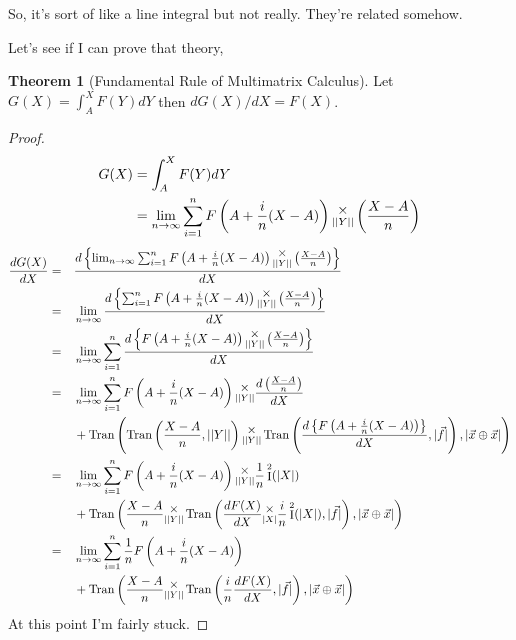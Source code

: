 \documentclass[12pt]{article}
\theoremstyle{definition}
\newtheorem{theorem}{Theorem}[section]
\theoremstyle{case}
\theoremstyle{ppart}
\DeclareMathOperator{\Ident}{I}
\DeclareMathOperator{\Tran}{Tran}
\newcommand{\mmult}[1]{\text{\raisebox{1ex}{$\underset{#1}{\times}$}}}
\begin{document}
So, it's sort of like a line integral but not really. They're related somehow.

\begin{landscape}
Let's see if I can prove that theory,
\begin{theorem}[Fundamental Rule of Multimatrix Calculus]
Let $G(X) = \int_A^X F(Y) dY$ then $dG(X)/dX = F(X)$.
\end{theorem}
\begin{proof}
\begin{align*}
	G(X)
	&= \int_A^X F(Y) dY \\
	&= 
		\lim_{n \to \infty}
	 	\sum_{i=1}^n
		  F\left(A+\frac{i}{n}(X-A)\right)
		  \mmult{||Y||}
		  \left(\frac{X-A}{n}\right)
\end{align*}
\begin{alignat*}{3}
	\frac{dG(X)}{dX}
	&=&&
	  \frac{
			d \left\{
			\lim_{n \to \infty}
			\sum_{i=1}^n
				F\left(A+\frac{i}{n}(X-A)\right)
				\mmult{||Y||}
				\left(\frac{X-A}{n}\right)
			\right\}
		}{dX} \\
	&=&&
		\lim_{n \to \infty}
		\frac{
			d \left\{
			\sum_{i=1}^n
				F\left(A+\frac{i}{n}(X-A)\right)
				\mmult{||Y||}
				\left(\frac{X-A}{n}\right)
			\right\}
		}{dX} \\
	&=&&
		\lim_{n \to \infty}
		\sum_{i=1}^n
			\frac{
				d \left\{
					F\left(A+\frac{i}{n}(X-A)\right)
					\mmult{||Y||}
					\left(\frac{X-A}{n}\right)
				\right\}
			}{dX} \\
	&=&&
		\lim_{n \to \infty}
			\sum_{i=1}^n
				F\left(A+\frac{i}{n}(X-A)\right)
					\mmult{||Y||}
					\frac{d \left(\frac{X-A}{n}\right)}{dX}
				\\&&&+
				\Tran\left(
					\Tran\left(\frac{X-A}{n}, ||Y||\right)
					\mmult{||Y||}
					\Tran\left(\frac{
						d \left\{F\left(A+\frac{i}{n}(X-A)\right)\right\}
					}{dX}, |\vec{f}|\right),
					|\vec{x} \oplus \vec{x}|
				\right) \\
	&=&&
		\lim_{n \to \infty}
			\sum_{i=1}^n
				F\left(A+\frac{i}{n}(X-A)\right)
					\mmult{||Y||}
					\frac{1}{n}\Ident^2(|X|)
				\\&&&+
				\Tran\left(
					\frac{X-A}{n}
					\mmult{||Y||}
					\Tran\left(
						\frac{dF(X)}{dX}
						\mmult{|X|}
						\frac{i}{n}\Ident^2(|X|), |\vec{f}|\right),
					|\vec{x} \oplus \vec{x}|
				\right) \\
	&=&&
		\lim_{n \to \infty}
			\sum_{i=1}^n
				\frac{1}{n}F\left(A+\frac{i}{n}(X-A)\right)
				\\&&&+
				\Tran\left(
					\frac{X-A}{n}
					\mmult{||Y||}
					\Tran\left(
						\frac{i}{n}\frac{dF(X)}{dX}
						, |\vec{f}|\right),
					|\vec{x} \oplus \vec{x}|
				\right)
\end{alignat*}
At this point I'm fairly stuck.
\end{proof}
\end{landscape}
\end{document}
